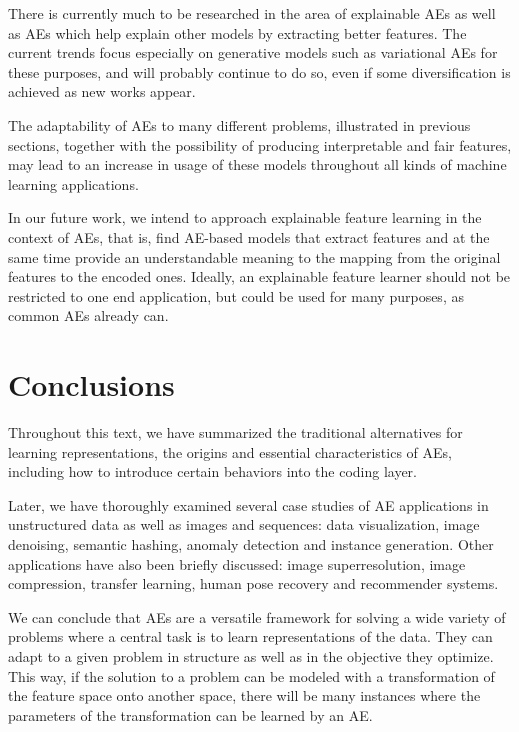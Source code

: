 There is currently much to be researched in the area of explainable AEs as well as AEs which help explain other models by extracting better features. The current trends focus especially on generative models such as variational AEs for these purposes, and will probably continue to do so, even if some diversification is achieved as new works appear.

The adaptability of AEs to many different problems, illustrated in previous sections, together with the possibility of producing interpretable and fair features, may lead to an increase in usage of these models throughout all kinds of machine learning applications. 

In our future work, we intend to approach explainable feature learning in the context of AEs, that is, find AE-based models that extract features and at the same time provide an understandable meaning to the mapping from the original features to the encoded ones. Ideally, an explainable feature learner should not be restricted to one end application, but could be used for many purposes, as common AEs already can.


\section{Conclusions}\label{sec:co}

Throughout this text, we have summarized the traditional alternatives for learning representations, the origins and essential characteristics of AEs, including how to introduce certain behaviors into the coding layer. 

Later, we have thoroughly examined several case studies of AE applications in unstructured data as well as images and sequences: data visualization, image denoising, semantic hashing, anomaly detection and instance generation. Other applications have also been briefly discussed: image superresolution, image compression, transfer learning, human pose recovery and recommender systems. 


We can conclude that AEs are a versatile framework for solving a wide variety of problems where a central task is to learn representations of the data. They can adapt to a given problem in structure as well as in the objective they optimize. This way, if the solution to a problem can be modeled with a transformation of the feature space onto another space, there will be many instances where the parameters of the transformation can be learned by an AE.


